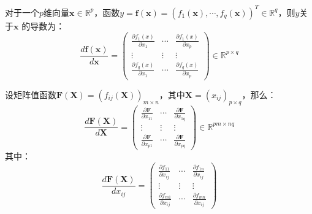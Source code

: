 \documentclass[11pt,fleqn, UTF8]{ctexbook} %
\begin{document}
对于一个$p$维向量$\boldsymbol{x}\in \mathbb{R}^p$，函数$y=\boldsymbol{f}(\boldsymbol{x})=\left(f_1(\boldsymbol{x}), \cdots , f_q(\boldsymbol{x})\right)^T\in\mathbb{R}^q$，则$y$关于$\boldsymbol{x}$ 的导数为：
\begin{equation}\label{2.10}
  \frac{d\boldsymbol{f}(\boldsymbol{x})}{d\boldsymbol{x}}=\begin{pmatrix}\frac{\partial f_1(x)}{\partial x_1} & \cdots & \frac{\partial f_1(x)}{\partial x_p}\\ \vdots & \vdots & \vdots\\ \frac{\partial f_q(x)}{\partial x_1} & \cdots & \frac{\partial f_q(x)}{\partial x_p} \end{pmatrix}\in\mathbb{R}^{p\times q}
\end{equation}

设矩阵值函数$\boldsymbol{F}(\boldsymbol{X})=(f_{ij}(\boldsymbol{X}))_{m\times n}$，其中$\boldsymbol{X}=(x_{ij})_{p\times q}$，那么：
\begin{equation}\label{divmat}
  \frac{d\boldsymbol{F}(\boldsymbol{X})}{d\boldsymbol{X}}=\begin{pmatrix}\frac{\partial \boldsymbol{F}}{\partial x_{11}} & \cdots & \frac{\partial \boldsymbol{F}}{\partial x_{1q}}\\ \vdots & \vdots & \vdots\\ \frac{\partial \boldsymbol{F}}{\partial x_{p1}} & \cdots & \frac{\partial \boldsymbol{F}}{\partial x_{pq}} \end{pmatrix}\in\mathbb{R}^{pm\times nq}
\end{equation}
其中：
\begin{equation}\label{innerdivmat}
  \frac{d\boldsymbol{F}(\boldsymbol{X})}{dx_{ij}}=\begin{pmatrix}\frac{\partial f_{11}}{\partial x_{ij}} & \cdots & \frac{\partial f_{1n}}{\partial x_{ij}}\\ \vdots & \vdots & \vdots\\ \frac{\partial f_{m1}}{\partial x_{ij}} & \cdots & \frac{\partial f_{mn}}{\partial x_{ij}} \end{pmatrix}
\end{equation}
\end{document}
